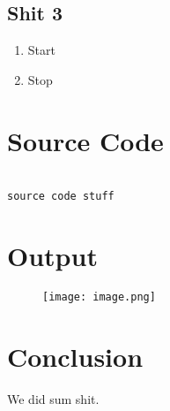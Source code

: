 \documentclass[12pt]{article}
\begin{document}
	\subsection{Shit 3}
	\begin{enumerate}
		\item Start
		\item Stop
	\end{enumerate}

\newpage
	\section{Source Code}

\begin{verbatim}

source code stuff
\end{verbatim}
	\section{Output}

	\begin{figure}[!h]
		\hspace*{-1cm}
		\centering
		\texttt{[image: image.png]}
		\caption{}
		\label{fig:}
	\end{figure}

	\section{Conclusion}
	We did sum shit.
\end{document}

